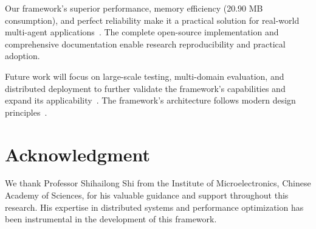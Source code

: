 \documentclass[conference]{IEEEtran}
\begin{document}
Our framework's superior performance, memory efficiency (20.90 MB consumption), and perfect reliability make it a practical solution for real-world multi-agent applications~\cite{newman2021building,vernon2013implementing}. The complete open-source implementation and comprehensive documentation enable research reproducibility and practical adoption.

Future work will focus on large-scale testing, multi-domain evaluation, and distributed deployment to further validate the framework's capabilities and expand its applicability~\cite{multiagent_llm2024,distributed_ai2025,dsl_evolution2025,schmidhuber2015deep}. The framework's architecture follows modern design principles~\cite{kleppmann2017designing,richardson2018microservices}.

\section*{Acknowledgment}

We thank Professor Shihailong Shi from the Institute of Microelectronics, Chinese Academy of Sciences, for his valuable guidance and support throughout this research. His expertise in distributed systems and performance optimization has been instrumental in the development of this framework.



\end{document}
